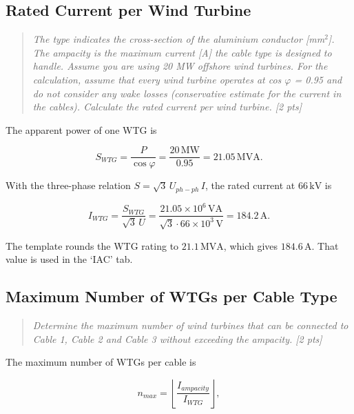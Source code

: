 \subsection{Rated Current per Wind Turbine}
\label{sec:elec-current}
\begin{quote}
\emph{The type indicates the cross-section of the aluminium conductor [mm$^2$]. The ampacity is the maximum current [A] the cable type is designed to handle. Assume you are using 20 MW offshore wind turbines. For the calculation, assume that every wind turbine operates at cos $\varphi$ = 0.95 and do not consider any wake losses (conservative estimate for the current in the cables). Calculate the rated current per wind turbine. [2 pts]}
\end{quote}

The apparent power of one WTG is

\begin{equation}
    S_{WTG} = \frac{P}{\cos\varphi} = \frac{20\,\mathrm{MW}}{0.95} = 21.05\,\mathrm{MVA}.
    \label{eq:elec-swtg}
\end{equation}

With the three-phase relation $S = \sqrt{3}\,U_{ph-ph}\,I$, the rated current at $66\,\mathrm{kV}$ is

\begin{equation}
    I_{WTG} = \frac{S_{WTG}}{\sqrt{3}\,U} = \frac{21.05\times10^{6}\,\mathrm{VA}}{\sqrt{3}\cdot 66\times10^{3}\,\mathrm{V}} = 184.2\,\mathrm{A}.
    \label{eq:elec-iwtg}
\end{equation}

The template rounds the WTG rating to $21.1\,\mathrm{MVA}$, which gives $184.6\,\mathrm{A}$. That value is used in the `IAC' tab.

\subsection{Maximum Number of WTGs per Cable Type}
\label{sec:elec-nmax}
\begin{quote}
\emph{Determine the maximum number of wind turbines that can be connected to Cable 1, Cable 2 and Cable 3 without exceeding the ampacity. [2 pts]}
\end{quote}

The maximum number of WTGs per cable is

\begin{equation}
    n_{max} = \left\lfloor \frac{I_{ampacity}}{I_{WTG}} \right\rfloor,
    \label{eq:elec-nmax}
\end{equation}

